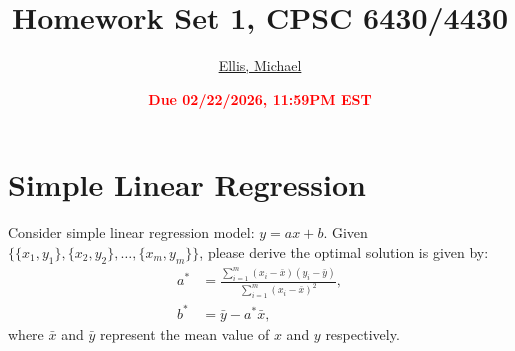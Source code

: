 \documentclass[11pt]{article}
\title{{\bf Homework Set 1, CPSC 6430/4430}}
\author{\Large\underline{Ellis, Michael}}
\date{\textbf{\Large\textcolor{red}{Due 02/22/2026, 11:59PM EST}}}
\newcommand{\R}{\mathbb{R}}
\newcommand{\minimize}{\operatorname*{minimize\ }}
\newcommand{\mtx}[1]{\mathbf{#1}}
\newcommand{\vct}[1]{\mathbf{#1}}
\def \mI {\mtx{I}}
\def \mU {\mtx{U}}
\def \mX {\mtx{X}}
\def \vv {\vct{v}}
\def \R {\mathbb{R}}
\begin{document}
\maketitle

\section*{Simple Linear Regression}
Consider simple linear regression model: $y=ax+b$. Given $\{\{x_1,y_1\},\{x_2,y_2\},\dots,\{x_m,y_m\}\}$, please derive the optimal solution is given by:
\begin{equation}
	\begin{aligned}
	a^*&=\frac{\sum\limits_{i=1}^{m}(x_i-\bar{x})(y_i-\bar{y})}{\sum\limits_{i=1}^{m}(x_i-\bar{x})^2},\\ b^*&=\bar{y}-a^*\bar{x},
	\end{aligned}
\end{equation}
where $\bar{x}$ and $\bar{y}$ represent the mean value of $x$ and $y$ respectively.
\end{document}
